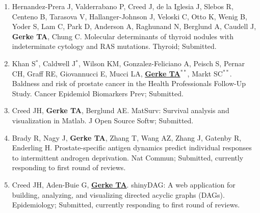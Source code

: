 \documentclass[11pt, a4paper]{article} %
\begin{document}
\begin{enumerate}[leftmargin=*]
\item{} Hernandez-Prera J, Valderrabano P, Creed J, de la Iglesia J, Slebos R, Centeno B, Tarasova V, Hallanger-Johnson J, Veloski C, Otto K, Wenig B, Yoder S, Lam C, Park D, Anderson A, Raghunand N, Berglund A, Caudell J, {\bf Gerke TA}, Chung C. Molecular determinants of thyroid nodules with indeterminate cytology and RAS mutations. Thyroid; Submitted.

\item{} Khan S$^*$, Caldwell J$^*$, Wilson KM, Gonzalez-Feliciano A, Peisch S, Pernar CH, Graff RE, Giovannucci E, Mucci LA, \underline{{\bf Gerke TA$^{**}$}}, Markt SC$^{**}$. Baldness and risk of prostate cancer in the Health Professionals Follow-Up Study. Cancer Epidemiol Biomarkers Prev; Submitted.

\item{} Creed JH, {\bf Gerke TA}, Berglund AE. MatSurv: Survival analysis and visualization in Matlab. J Open Source Softw; Submitted.

\item{} Brady R, Nagy J, {\bf Gerke TA}, Zhang T, Wang AZ, Zhang J, Gatenby R, Enderling H. Prostate-specific antigen dynamics predict individual responses to intermittent androgen deprivation. Nat Commun; Submitted, currently responding to first round of reviews.

\item{} Creed JH, Aden-Buie G, \underline{{\bf Gerke TA}}. shinyDAG: A web application for building, analyzing, and visualizing directed acyclic graphs (DAGs). Epidemiology; Submitted, currently responding to first round of reviews. 

\end{enumerate}
\end{document}
